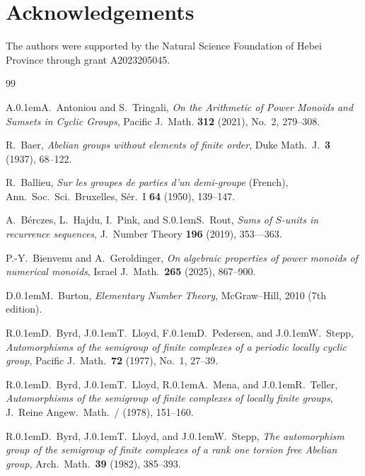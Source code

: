 \documentclass[11pt,reqno]{amsart}
\theoremstyle{definition}
\theoremstyle{remark}
\theoremstyle{theoremdd}
\renewcommand{\,}{\kern 0.1em}
\begin{document}
\section*{Acknowledgements}

The authors were supported by the Natural Science Foun\-da\-tion of Hebei Province through grant A2023205045. 
\begin{thebibliography}{99}

 A.\,A.~Antoniou and S.~Tringali, \textit{On the Arithmetic of Power Monoids and Sumsets in Cyclic Groups}, Pacific J.\ Math. \textbf{312} (2021), No.\ 2, 279--308.
 
 R.~Baer, \textit{Abelian groups without elements of finite order}, Duke Math.\ J.~\textbf{3} (1937), 68--122.

 R.~Ballieu, \textit{Sur les groupes de parties d'un demi-groupe} (French), Ann.\ Soc.\ Sci.\ Bruxelles, S\'er.\ I \textbf{64} (1950), 139--147.

 A.~B{\'e}rczes, L.~Hajdu, I.~Pink, and S.\,S.~Rout, \textit{Sums of $S$-units in recurrence sequences}, J.~Number Theory \textbf{196} (2019), 353---363.

 P.-Y.~Bienvenu and A.~Geroldinger, \textit{On algebraic properties of power monoids of numerical monoids}, Israel J.\ Math.\ \textbf{265} (2025), 867--900.

 D.\,M.~Burton, \textit{Elementary Number Theory}, McGraw--Hill, 2010 (7th edition).

  R.\,D.~Byrd, J.\,T.~Lloyd, F.\,D.~Pedersen, and J.\,W.~Stepp, \textit{Automorphisms of the semigroup of finite complexes of a periodic locally cyclic group}, Pacific J.~Math.\ \textbf{72} (1977), No.~1, 27--39.

 R.\,D.~Byrd, J.\,T.~Lloyd, R.\,A.~Mena, and J.\,R.~Teller, \textit{Automorphisms of the semigroup of finite complexes of locally finite groups}, J.~Reine Angew.\ Math.\ / (1978), 151--160.

 R.\,D.~Byrd, J.\,T.~Lloyd, and J.\,W.~Stepp, \textit{The automorphism group of the semigroup of finite complexes of a rank one torsion free Abelian group}, Arch.\ Math.\ \textbf{39} (1982), 385--393.


\end{thebibliography}
\end{document}
